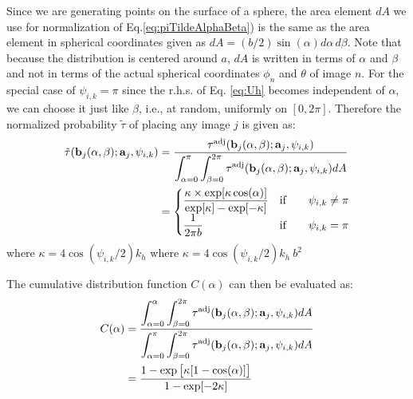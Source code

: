     Since we are generating points on the surface of a sphere, the area element $dA$ we use for normalization of Eq.\eqref{eq:piTildeAlphaBeta}) is the same as the area element in spherical coordinates given as $dA = (b/2) \sin(\alpha) d\alpha \, d\beta$. Note that because the distribution is centered around $a$, $dA$ is written in terms of $\alpha$ and $\beta$ and not in terms of the actual spherical coordinates $\phi_n$ and $\theta$ of image $n$. For the special case of $\psi_{i,k} = \pi$ since the r.h.s. of Eq. \eqref{eq:Uh} becomes independent of $\alpha$, we can choose it just like $\beta$, i.e., at random, uniformly on $[0, 2\pi]$. Therefore the normalized probability $\tilde \tau$ of placing any image $j$ is given as:
    \begin{equation}
    \label{eq:piTildebj}
        \begin{aligned}
            \tilde \tau({\mathbf {b}}_j(\alpha, \beta);{\mathbf {a}}_j,\psi_{i,k}) &= \frac{\tau^\text{adj}({\mathbf {b}}_j(\alpha, \beta);{\mathbf {a}}_j,\psi_{i,k}) }{\displaystyle\int_{\alpha = 0}^\pi \int_{\beta = 0}^{2 \pi} \tau^\text{adj}({\mathbf {b}}_j(\alpha, \beta);{\mathbf {a}}_j,\psi_{i,k}) dA}\\
            &=
            \begin{cases}
                \displaystyle\frac{\kappa \times \exp[\kappa \cos (\alpha)]}{\exp[\kappa] - \exp[-\kappa]} & \text{if} \qquad \psi_{i,k} \ne \pi\\
                \displaystyle\frac{1}{2 \pi b} & \text{if} \qquad \psi_{i,k} = \pi\\
            \end{cases}
        \end{aligned}
    \end{equation}
    \ifkhExplicitP
        where $\kappa = 4 \cos(\psi_{i,k}/2) k_h$
    \else
        where $\kappa = 4 \cos(\psi_{i,k}/2) k_h~b^2$
    \fi

    The cumulative distribution function $C(\alpha)$ can then be evaluated as:
    \begin{equation}
    \label{eq:cdf}
        \begin{aligned}
            C(\alpha) &= \frac{\displaystyle\int_{\alpha = 0}^\alpha \int_{\beta = 0}^{2 \pi} \tau^\text{adj}({\mathbf {b}}_j(\alpha, \beta);{\mathbf {a}}_j,\psi_{i,k}) dA}{\displaystyle\int_{\alpha = 0}^\pi \int_{\beta = 0}^{2 \pi} \tau^\text{adj}({\mathbf {b}}_j(\alpha, \beta);{\mathbf {a}}_j,\psi_{i,k}) dA}\\
            &= \displaystyle\frac{1 - \exp \big[\kappa [1 - \cos (\alpha)] \big]}{1 - \exp [-2 \kappa]}
        \end{aligned}
    \end{equation}
